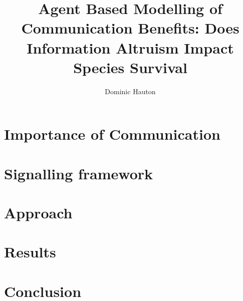 \documentclass[a4paper,10pt,twocolumn]{report}
\title{Agent Based Modelling of Communication Benefits: Does Information Altruism Impact Species Survival}
\author{Dominic Hauton}
\begin{document}
\maketitle

\section{Importance of Communication}

\section{Signalling framework}

\section{Approach}

\section{Results}

\section{Conclusion}
\end{document}

